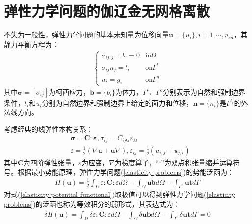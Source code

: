 \documentclass[a4paper]{ctexbook}
\begin{document}
\section{弹性力学问题的伽辽金无网格离散}
不失为一般性，弹性力学问题的基本未知量为位移向量$\pmb{u}=\{u_i\},i=1,\dotsb,n_{sd}$，其静力平衡方程为：
\begin{equation}\label{elasticity problems}
\begin{split}
\begin{cases}
    \sigma_{ij,j}+b_i=0&\text{in}\Omega\\
    \sigma_{ij}n_j=t_i&\text{on}\Gamma^t\\
    u_i=g_i&\text{on}\Gamma^g
\end{cases}
\end{split}
\end{equation}
其中$\pmb \sigma=[\sigma_{ij}]$为柯西应力，$\pmb{b}=\{b_i\}$为体力，$\Gamma^t、\Gamma^g$分别表示为自然和强制边界条件，$t_i$和$u_i$分别为自然边界和强制边界上给定的面力和位移，$\pmb{n}=\{n_i\}$是$\Gamma^{t_i}$的外法线方向。\par
考虑经典的线弹性本构关系：
\begin{equation}\label{constitutive relation}
\begin{split}
        &\pmb{\sigma}=\pmb{C}\pmb{:}\pmb \varepsilon,\sigma_{ij}=C_{ijkl}\varepsilon_{kl}\\
        &\varepsilon=\frac{1}{2}(\nabla \pmb{u}+\pmb{u}\nabla),\varepsilon_{ij}=\frac{1}{2}(u_{i,j}+u_{j,i})
\end{split}
\end{equation}
其中$\pmb{C}$为四阶弹性张量，$\varepsilon$为应变，$\nabla$为梯度算子，“:”为双点积张量缩并运算符号。根据最小势能原理，弹性力学问题(\ref{elasticity problems})的势能泛函为：
\begin{equation}\label{elasticity potential functional}
\begin{split}
    \Pi(\pmb{u})=\frac{1}{2}\int_{\Omega}\varepsilon:\pmb{C}:\varepsilon d\Omega-\int_{\Omega}\pmb{u}\pmb{b}d\Omega-\int_{\Gamma^t}\pmb{u}\pmb{t}d\Gamma
\end{split}
\end{equation}
对式(\ref{elasticity potential functional})取极值可以得到弹性力学问题(\ref{elasticity problems})的泛函也称为等效积分的弱形式，其表达式为：
\begin{equation}
\begin{split}
    \delta\Pi(\pmb{u})=\int_{\Omega}\delta\varepsilon:\pmb{C}:\varepsilon d\Omega-\int_{\Omega}\delta\pmb{u}\pmb{b}d\Omega-\int_{\Gamma^t}\delta\pmb{u}\pmb{t}d\Gamma=0
\end{split}
\end{equation}\par
\end{document}
